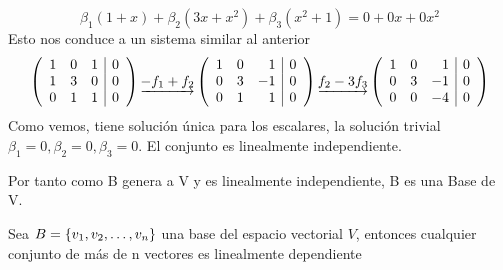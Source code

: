 \[\beta_1(1+x)+
\beta_2(3x+x^2)+
\beta_3(x^2+1)=
0+0x+0x^2\]
Esto nos conduce a un sistema similar al anterior
$$\reducir{{rrr|l}}{1&0&1&0\\1&3&0&0\\0&1&1&0}
\underrightarrow{-f_1+f_2}
\reducir{rrr|l}{1&0&1&0\\0&3&-1&0\\0&1&1&0}
\underrightarrow{f_2 - 3f_3}
\reducir{rrr|l}{1&0&1&0\\0&3&-1&0\\0&0&-4&0}$$
Como vemos, tiene solución única para los escalares, la solución trivial $\beta_1=0, \beta_2=0, \beta_3=0$. El conjunto es linealmente independiente.


Por tanto como B genera a V y es linealmente independiente, B es una Base de V.



\begin{theorem}\label{th_masde_n}
Sea $B= \lbrace v_1, v_2, \ldots, v_n \rbrace$ una base del espacio vectorial $V$, entonces cualquier conjunto de m\'as de n vectores es linealmente dependiente

\end{theorem}

